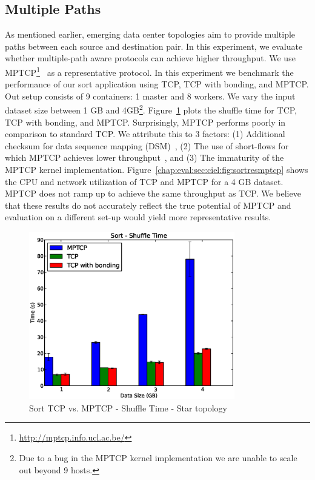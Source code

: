 \documentclass[a4paper,12pt,twoside,openright]{report}
\begin{document}
\subsection{Multiple Paths}
As mentioned earlier, emerging data center topologies aim to provide multiple
paths between each source and destination pair. In this experiment, we evaluate
whether multiple-path aware protocols can achieve higher throughput. We use
MPTCP\footnote{\url{http://mptcp.info.ucl.ac.be/}}~\cite{Raiciu:2012:HHC} as a
representative protocol. In this experiment we benchmark the performance of our
sort application using TCP, TCP with bonding, and MPTCP. Out setup consists of 9
containers: 1 master and 8 workers. We vary the input dataset size between 1 GB
and 4GB\footnote{Due to a bug in the MPTCP kernel implementation we are unable
to scale out beyond 9 hosts.}.
Figure~\ref{chap:eval:sec:ciel:fig:sortshufflemptcp} plots the shuffle time for
TCP, TCP with bonding, and MPTCP. Surprisingly, MPTCP performs poorly in
comparison to standard TCP. We attribute this to 3 factors: (1) Additional
checksum for data sequence mapping (DSM)~\cite{Raiciu:2012:HHC}, (2) The use of
short-flows for which MPTCP achieves lower throughput~\cite{Raiciu:2010:DCN},
and (3) The immaturity of the MPTCP kernel implementation.
Figure~\ref{chap:eval:sec:ciel:fig:sortresmptcp} shows the CPU and network
utilization of TCP and MPTCP for a 4 GB dataset. MPTCP does not ramp up to
achieve the same throughput as TCP. We believe that these results do not
accurately reflect the true potential of MPTCP and evaluation on a different
set-up would yield more representative results.


 \begin{figure}[h!]
  \centering
    \includegraphics[width=0.8\textwidth]{shuffle_sort_mptcp.eps}
    \caption{Sort TCP vs. MPTCP - Shuffle Time - Star topology}
    \label{chap:eval:sec:ciel:fig:sortshufflemptcp}
\end{figure}
\end{document}

